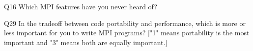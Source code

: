 \begin{description}%
\item{Q16} Which MPI features have you never heard of?%
\item{Q29} In the tradeoff between code portability and performance, which is more or less important for you to write MPI programs? ["1" means portability is the most important and "3" means both are equally important.]%
\end{description}%
